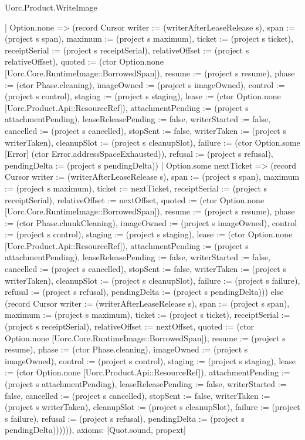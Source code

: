 \begin{lexlean}{Uorc.Product.WriteImage}
\begin{semanticmodule}
{      | Option.none => (record Cursor {writer := (writerAfterLeaseRelease s), span := (project s span), maximum := (project s maximum), ticket := (project s ticket), receiptSerial := (project s receiptSerial), relativeOffset := (project s relativeOffset), quoted := (ctor Option.none [Uorc.Core.RuntimeImage::BorrowedSpan]), resume := (project s resume), phase := (ctor Phase.cleaning), imageOwned := (project s imageOwned), control := (project s control), staging := (project s staging), lease := (ctor Option.none [Uorc.Product.Api::ResourceRef]), attachmentPending := (project s attachmentPending), leaseReleasePending := false, writerStarted := false, cancelled := (project s cancelled), stopSent := false, writerTaken := (project s writerTaken), cleanupSlot := (project s cleanupSlot), failure := (ctor Option.some [Error] (ctor Error.addressSpaceExhausted)), refusal := (project s refusal), pendingDelta := (project s pendingDelta)})
      | Option.some nextTicket => (record Cursor {writer := (writerAfterLeaseRelease s), span := (project s span), maximum := (project s maximum), ticket := nextTicket, receiptSerial := (project s receiptSerial), relativeOffset := nextOffset, quoted := (ctor Option.none [Uorc.Core.RuntimeImage::BorrowedSpan]), resume := (project s resume), phase := (ctor Phase.chunkCleaning), imageOwned := (project s imageOwned), control := (project s control), staging := (project s staging), lease := (ctor Option.none [Uorc.Product.Api::ResourceRef]), attachmentPending := (project s attachmentPending), leaseReleasePending := false, writerStarted := false, cancelled := (project s cancelled), stopSent := false, writerTaken := (project s writerTaken), cleanupSlot := (project s cleanupSlot), failure := (project s failure), refusal := (project s refusal), pendingDelta := (project s pendingDelta)})) else (record Cursor {writer := (writerAfterLeaseRelease s), span := (project s span), maximum := (project s maximum), ticket := (project s ticket), receiptSerial := (project s receiptSerial), relativeOffset := nextOffset, quoted := (ctor Option.none [Uorc.Core.RuntimeImage::BorrowedSpan]), resume := (project s resume), phase := (ctor Phase.cleaning), imageOwned := (project s imageOwned), control := (project s control), staging := (project s staging), lease := (ctor Option.none [Uorc.Product.Api::ResourceRef]), attachmentPending := (project s attachmentPending), leaseReleasePending := false, writerStarted := false, cancelled := (project s cancelled), stopSent := false, writerTaken := (project s writerTaken), cleanupSlot := (project s cleanupSlot), failure := (project s failure), refusal := (project s refusal), pendingDelta := (project s pendingDelta)}))))),
  axioms: [Quot.sound, propext]
}


\end{semanticmodule}
\end{lexlean}

